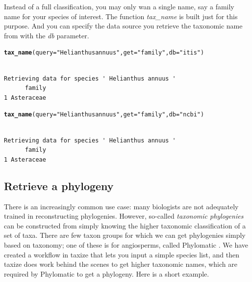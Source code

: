 \documentclass[letterpaper,superscriptaddress,showkeys,longbibliography]{revtex4-1}\usepackage{graphicx, color}
\makeatletter
\newcommand{\hlfunctioncall}[1]{\textcolor[rgb]{0.501960784313725,0,0.329411764705882}{\textbf{#1}}}%
\newcommand{\hlstring}[1]{\textcolor[rgb]{0.6,0.6,1}{#1}}%
\newenvironment{kframe}{%
 \def\at@end@of@kframe{}%
 \ifinner\ifhmode%
  \def\at@end@of@kframe{\end{minipage}}%
  \begin{minipage}{\columnwidth}%
 \fi\fi%
 \def\FrameCommand##1{\hskip\@totalleftmargin \hskip-\fboxsep
 \colorbox{shadecolor}{##1}\hskip-\fboxsep
     \hskip-\linewidth \hskip-\@totalleftmargin \hskip\columnwidth}%
 \MakeFramed {\advance\hsize-\width
   \@totalleftmargin\z@ \linewidth\hsize
   \@setminipage}}%
 {\par\unskip\endMakeFramed%
 \at@end@of@kframe}
\newenvironment{knitrout}{}{} %
\makeatother
\begin{document}
Instead of a full classification, you may only wan a single name, say a family name for your species of interest. The function \emph{tax\_name} is built just for this purpose. And you can specify the data source you retrieve the taxonomic name from with the \emph{db} parameter. 

\begin{knitrout}
\color{fgcolor}\begin{kframe}
\begin{alltt}
\hlfunctioncall{tax_name}(query = \hlstring{"Helianthus annuus"}, get = \hlstring{"family"}, db = \hlstring{"itis"})
\end{alltt}
\begin{verbatim}

Retrieving data for species ' Helianthus annuus '
      family
1 Asteraceae
\end{verbatim}
\begin{alltt}
\hlfunctioncall{tax_name}(query = \hlstring{"Helianthus annuus"}, get = \hlstring{"family"}, db = \hlstring{"ncbi"})
\end{alltt}
\begin{verbatim}

Retrieving data for species ' Helianthus annuus '
      family
1 Asteraceae
\end{verbatim}
\end{kframe}
\end{knitrout}



\subsection{Retrieve a phylogeny}

There is an increasingly common use case: many biologists are not adequately trained in reconstructing phylogenies. However, so-called \emph{taxonomic phylogenies} can be constructed from simply knowing the higher taxonomic classification of a set of taxa. There are few taxon groups for which we can get phylogenies simply based on taxonomy; one of these is for angiosperms, called Phylomatic \cite{webb2005}. We have created a workflow in taxize that lets you input a simple species list, and then taxize does work behind the scenes to get higher taxonomic names, which are required by Phylomatic to get a phylogeny. Here is a short example. 
\end{document}
